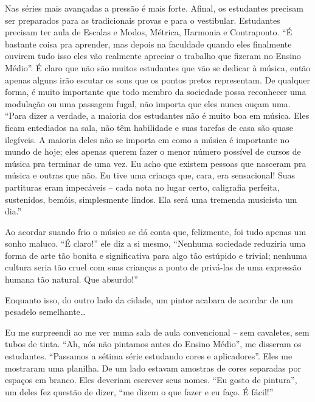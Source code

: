 \documentclass[a4paper,oneside,10pt,notitlepage]{article}
\begin{document}
Nas séries mais avançadas a pressão é mais forte.
Afinal, os estudantes precisam ser preparados para as tradicionais provas e para o vestibular.
Estudantes precisam ter aula de Escalas e Modos, Métrica, Harmonia e Contraponto.
``É bastante coisa pra aprender, mas depois na faculdade quando eles finalmente ouvirem tudo isso eles vão realmente apreciar o trabalho que fizeram no Ensino Médio''.
É claro que não são muitos estudantes que vão se dedicar à música, então apenas alguns irão escutar os sons que os pontos pretos representam.
De qualquer forma, é muito importante que todo membro da sociedade possa reconhecer uma modulação ou uma passagem fugal, não importa que eles nunca ouçam uma.
``Para dizer a verdade, a maioria dos estudantes não é muito boa em música.
Eles ficam entediados na sala, não têm habilidade e suas tarefas de casa são quase ilegíveis.
A maioria deles não se importa em como a música é importante no mundo de hoje;
eles apenas querem fazer o menor número possível de cursos de música pra terminar de uma vez.
Eu acho que existem pessoas que nasceram pra música e outras que não.
Eu tive uma criança que, cara, era sensacional!
Suas partituras eram impecáveis -- cada nota no lugar certo, caligrafia perfeita, sustenidos, bemóis, simplesmente lindos.
Ela será uma tremenda musicista um dia.''

Ao acordar suando frio o músico se dá conta que, felizmente, foi tudo apenas um sonho maluco.
``É claro!'' ele diz a si mesmo,
``Nenhuma sociedade reduziria uma forma de arte tão bonita e significativa para algo tão estúpido e trivial;
nenhuma cultura seria tão cruel com suas crianças a ponto de privá-las de uma expressão humana tão natural.
Que absurdo!''

Enquanto isso, do outro lado da cidade, um pintor acabara de acordar de um pesadelo semelhante\ldots

\vspace{1em}

Eu me surpreendi ao me ver numa sala de aula convencional -- sem cavaletes, sem tubos de tinta.
``Ah, nós não pintamos antes do Ensino Médio'',
me disseram os estudantes.
``Passamos a sétima série estudando cores e aplicadores''.
Eles me mostraram uma planilha.
De um lado estavam amostras de cores separadas por espaços em branco.
Eles deveriam escrever seus nomes.
``Eu gosto de pintura'',
um deles fez questão de dizer,
``me dizem o que fazer e eu faço. É fácil!''
\end{document}
